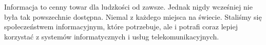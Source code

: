\label{chapter:rozdzialdrugi}
Informacja to cenny towar dla ludzkości od zawsze. Jednak nigdy wcześniej nie była tak powszechnie dostępna. Niemal z każdego miejsca na świecie. Staliśmy się społeczeństwem informacyjnym, które potrzebuje, ale i potrafi coraz lepiej korzystać z systemów informatycznych i usług telekomunikacyjnych.
